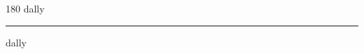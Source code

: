
\begin{frame}
\begin{center}
\begin{turn}{180}
{\fontsize{2.5cm}{1em}\selectfont dally}
\end{turn}
\vspace{1em}\par  
\hrule
\vspace{1em}\par  
{\fontsize{2.5cm}{1em}\selectfont dally}
\end{center}
\end{frame}
